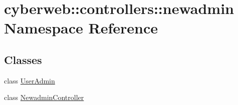 \hypertarget{namespacecyberweb_1_1controllers_1_1newadmin}{\section{cyberweb\-:\-:controllers\-:\-:newadmin \-Namespace \-Reference}
\label{namespacecyberweb_1_1controllers_1_1newadmin}
}
\subsection*{\-Classes}
\begin{DoxyCompactItemize}
\item 
class \hyperlink{classcyberweb_1_1controllers_1_1newadmin_1_1_user_admin}{\-User\-Admin}
\item 
class \hyperlink{classcyberweb_1_1controllers_1_1newadmin_1_1_newadmin_controller}{\-Newadmin\-Controller}
\end{DoxyCompactItemize}
